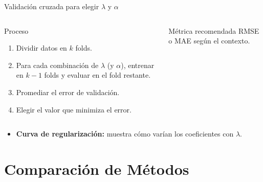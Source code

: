 \documentclass[aspectratio=169, 10pt, xcolor=table]{beamer}
\begin{document}
\begin{frame}{Validación cruzada para elegir $\lambda$ y $\alpha$}
    \begin{columns}[t]
        \begin{block}{Proceso}
            \begin{enumerate}
                \item Dividir datos en $k$ folds.
                \item Para cada combinación de $\lambda$ (y $\alpha$), entrenar en $k-1$ folds y evaluar en el fold restante.
                \item Promediar el error de validación.
                \item Elegir el valor que minimiza el error.
            \end{enumerate}
        \end{block}
        \begin{exampleblock}{Métrica recomendada}
            RMSE o MAE según el contexto.
        \end{exampleblock}
    \end{columns}
    \vspace{0.3cm}
    \begin{itemize}
        \item \textbf{Curva de regularización:} muestra cómo varían los coeficientes con $\lambda$.
    \end{itemize}
\end{frame}

\section{Comparación de Métodos}
\end{document}
